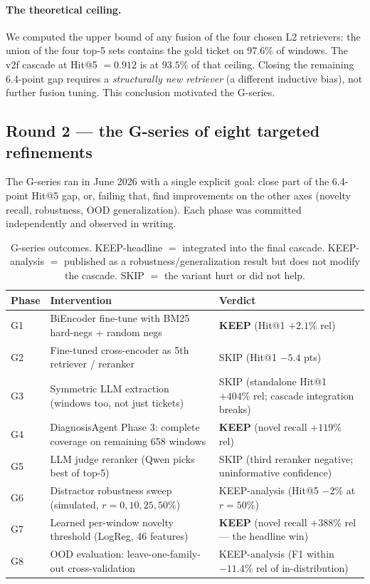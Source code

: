 \paragraph{The theoretical ceiling.} We computed the upper bound of any fusion of the four chosen L2 retrievers: the union of the four top-5 sets contains the gold ticket on 97.6\% of windows. The v2f cascade at Hit@5 $= 0.912$ is at $93.5\%$ of that ceiling. Closing the remaining 6.4-point gap requires a \emph{structurally new retriever} (a different inductive bias), not further fusion tuning. This conclusion motivated the G-series.

\subsection{Round 2 --- the G-series of eight targeted refinements}

The G-series ran in June 2026 with a single explicit goal: close part of the 6.4-point Hit@5 gap, or, failing that, find improvements on the other axes (novelty recall, robustness, OOD generalization). Each phase was committed independently and observed in writing.

\begin{table}[h]
\centering
\caption{G-series outcomes. KEEP-headline $=$ integrated into the final cascade. KEEP-analysis $=$ published as a robustness/generalization result but does not modify the cascade. SKIP $=$ the variant hurt or did not help.}
\label{tab:g-summary}
\small
\setlength{\tabcolsep}{4pt}
\renewcommand{\arraystretch}{1.15}
\begin{tabularx}{\linewidth}{@{}l >{\raggedright\arraybackslash}X >{\raggedright\arraybackslash}X@{}}
\toprule
Phase & Intervention & Verdict \\
\midrule
G1 & BiEncoder fine-tune with BM25 hard-negs + random negs & \textbf{KEEP} (Hit@1 $+2.1\%$ rel) \\
G2 & Fine-tuned cross-encoder as 5th retriever / reranker & SKIP (Hit@1 $-5.4$ pts) \\
G3 & Symmetric LLM extraction (windows too, not just tickets) & SKIP (standalone Hit@1 $+404\%$ rel; cascade integration breaks) \\
G4 & DiagnosisAgent Phase 3: complete coverage on remaining 658 windows & \textbf{KEEP} (novel recall $+119\%$ rel) \\
G5 & LLM judge reranker (Qwen picks best of top-5) & SKIP (third reranker negative; uninformative confidence) \\
G6 & Distractor robustness sweep (simulated, $r = 0, 10, 25, 50\%$) & KEEP-analysis (Hit@5 $-2\%$ at $r=50\%$) \\
G7 & Learned per-window novelty threshold (LogReg, 46 features) & \textbf{KEEP} (novel recall $+388\%$ rel --- the headline win) \\
G8 & OOD evaluation: leave-one-family-out cross-validation & KEEP-analysis (F1 within $-11.4\%$ rel of in-distribution) \\
\bottomrule
\end{tabularx}
\end{table}

